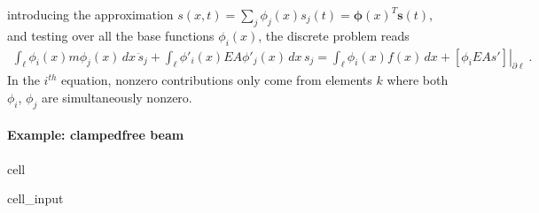 \documentclass[letterpaper,10pt,english]{jupyterBook}
\begin{document}
\sphinxAtStartPar
introducing the approximation \(s(x,t) = \sum_{j} \phi_j(x) s_j(t) = \boldsymbol\phi(x)^T \mathbf{s}(t)\), and testing over all the base functions \(\phi_i(x)\), the discrete problem reads
\begin{equation*}
\begin{split}\int_{\ell} \phi_i(x) m \phi_j(x) \, dx \, \ddot{s}_j + \int_{\ell} \phi'_i(x) EA \phi'_j(x) \, dx \, s_j = \int_{\ell} \phi_i(x) f(x) \, dx + \left.\left[ \phi_i EA s' \right]\right|_{\partial \ell} \ .\end{split}
\end{equation*}
\sphinxAtStartPar
In the \(i^{th}\) equation, non\sphinxhyphen{}zero contributions only come from elements \(k\) where both \(\phi_i\), \(\phi_j\) are simultaneously non\sphinxhyphen{}zero.


\paragraph{Example: clamped\sphinxhyphen{}free beam}
\label{\detokenize{ch/solids/small-displacements-fem-beams-decoupled:example-clamped-free-beam}}
\begin{sphinxuseclass}{cell}\begin{sphinxVerbatimInput}

\begin{sphinxuseclass}{cell_input}
\begin{sphinxVerbatim}[commandchars=\\\{\}]
   
   
   

      
  

  
    

       
  \PYG{p}{[}  \PYG{p}{]}
  \PYG{p}{[}  \PYG{p}{]}
  \PYG{p}{[}  \PYG{p}{]}
  \PYG{p}{[}  \PYG{p}{]}
\end{sphinxVerbatim}

\end{sphinxuseclass}\end{sphinxVerbatimInput}

\end{sphinxuseclass}
\end{document}
